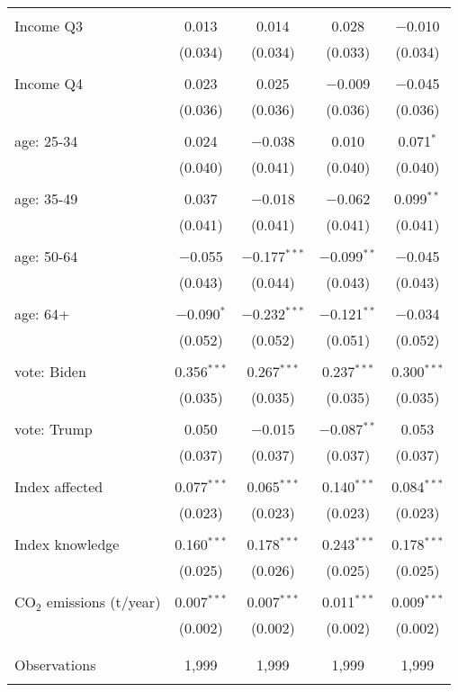\begin{tabular}{@{\extracolsep{5pt}}lcccc}
  & & & & \\ 
 Income Q3 & 0.013 & 0.014 & 0.028 & $-$0.010 \\ 
  & (0.034) & (0.034) & (0.033) & (0.034) \\ 
  & & & & \\ 
 Income Q4 & 0.023 & 0.025 & $-$0.009 & $-$0.045 \\ 
  & (0.036) & (0.036) & (0.036) & (0.036) \\ 
  & & & & \\ 
 age: 25-34 & 0.024 & $-$0.038 & 0.010 & 0.071$^{*}$ \\ 
  & (0.040) & (0.041) & (0.040) & (0.040) \\ 
  & & & & \\ 
 age: 35-49 & 0.037 & $-$0.018 & $-$0.062 & 0.099$^{**}$ \\ 
  & (0.041) & (0.041) & (0.041) & (0.041) \\ 
  & & & & \\ 
 age: 50-64 & $-$0.055 & $-$0.177$^{***}$ & $-$0.099$^{**}$ & $-$0.045 \\ 
  & (0.043) & (0.044) & (0.043) & (0.043) \\ 
  & & & & \\ 
 age: 64+ & $-$0.090$^{*}$ & $-$0.232$^{***}$ & $-$0.121$^{**}$ & $-$0.034 \\ 
  & (0.052) & (0.052) & (0.051) & (0.052) \\ 
  & & & & \\ 
 vote: Biden & 0.356$^{***}$ & 0.267$^{***}$ & 0.237$^{***}$ & 0.300$^{***}$ \\ 
  & (0.035) & (0.035) & (0.035) & (0.035) \\ 
  & & & & \\ 
 vote: Trump & 0.050 & $-$0.015 & $-$0.087$^{**}$ & 0.053 \\ 
  & (0.037) & (0.037) & (0.037) & (0.037) \\ 
  & & & & \\ 
 Index affected & 0.077$^{***}$ & 0.065$^{***}$ & 0.140$^{***}$ & 0.084$^{***}$ \\ 
  & (0.023) & (0.023) & (0.023) & (0.023) \\ 
  & & & & \\ 
 Index knowledge & 0.160$^{***}$ & 0.178$^{***}$ & 0.243$^{***}$ & 0.178$^{***}$ \\ 
  & (0.025) & (0.026) & (0.025) & (0.025) \\ 
  & & & & \\ 
 CO$_{2}$ emissions (t/year) & 0.007$^{***}$ & 0.007$^{***}$ & 0.011$^{***}$ & 0.009$^{***}$ \\ 
  & (0.002) & (0.002) & (0.002) & (0.002) \\ 
  & & & & \\ 
\hline \\[-1.8ex] 

Observations & 1,999 & 1,999 & 1,999 & 1,999 \\ 
\hline 
\hline \\[-1.8ex] 
\end{tabular} 